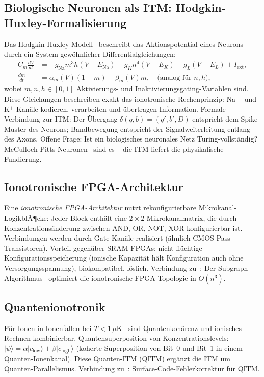 ﻿\documentclass[a4paper,12pt]{article}
\theoremstyle{plain}
\theoremstyle{definition}
\theoremstyle{remark}
\begin{document}
\subsection{Biologische Neuronen als ITM: Hodgkin-Huxley-Formalisierung}

Das Hodgkin-Huxley-Modell~\cite{hodgkin1952} beschreibt das Aktionspotential
eines Neurons durch ein System gew\"ohnlicher Differentialgleichungen:
\begin{align*}
C_m \frac{dV}{dt} &= -g_{\mathrm{Na}} m^3 h (V - E_{\mathrm{Na}})
                     -g_K n^4 (V - E_K) - g_L (V - E_L) + I_{\mathrm{ext}},\\
\frac{dm}{dt} &= \alpha_m(V)(1-m) - \beta_m(V)m, \quad \text{(analog f\"ur } n, h\text{)},
\end{align*}
wobei $m, n, h \in [0,1]$ Aktivierungs- und Inaktivierungsgating-Variablen sind.
Diese Gleichungen beschreiben exakt das ionotronische Rechenprinzip:
Na$^+$- und K$^+$-Kan\"ale kodieren, verarbeiten und \"ubertragen Information.
Formale Verbindung zur ITM: Der \"Ubergang $\delta(q, b) = (q', b', D)$
entspricht dem Spike-Muster des Neurons;
Bandbewegung entspricht der Signalweiterleitung entlang des Axons.
Offene Frage: Ist ein biologisches neuronales Netz Turing-vollst\"andig?
McCulloch-Pitts-Neuronen~\cite{mcculloch1943} sind es -- die ITM
liefert die physikalische Fundierung.

\subsection{Ionotronische FPGA-Architektur}

Eine \emph{ionotronische FPGA-Architektur} nutzt rekonfigurierbare
Mikrokanal-LogikblÃ¶cke:
Jeder Block enth\"alt eine $2 \times 2$ Mikrokanalmatrix, die durch Konzentrations\"anderung
zwischen AND, OR, NOT, XOR konfigurierbar ist.
Verbindungen werden durch Gate-Kan\"ale realisiert (\"ahnlich CMOS-Pass-Transistoren).
Vorteil gegen\"uber SRAM-FPGAs: nicht-fl\"uchtige Konfigurationsspeicherung
(ionische Kapazit\"at h\"alt Konfiguration auch ohne Versorgungsspannung),
biokompatibel, l\"oslich.
Verbindung zu~\cite{epp2026fpga}: Der Subgraph Algorithmus~\cite{epp2026subgraph}
optimiert die ionotronische FPGA-Topologie in $O(n^3)$.

\subsection{Quantenionotronik}

F\"ur Ionen in Ionenfallen bei $T < 1\,\mu$K~\cite{cirac1995} sind
Quantenkoh\"arenz und ionisches Rechnen kombinierbar.
Quantensuperposition von Konzentrationslevels:
$|\psi\rangle = \alpha|c_{\mathrm{low}}\rangle + \beta|c_{\mathrm{high}}\rangle$
(koherte Superposition von Bit~0 und Bit~1 in einem Quanten-Ionenkanal).
Diese Quanten-ITM (QITM) erg\"anzt die ITM um Quanten-Parallelismus.
Verbindung zu~\cite{epp2026qecc}: Surface-Code-Fehlerkorrektur f\"ur QITM.
\end{document}
